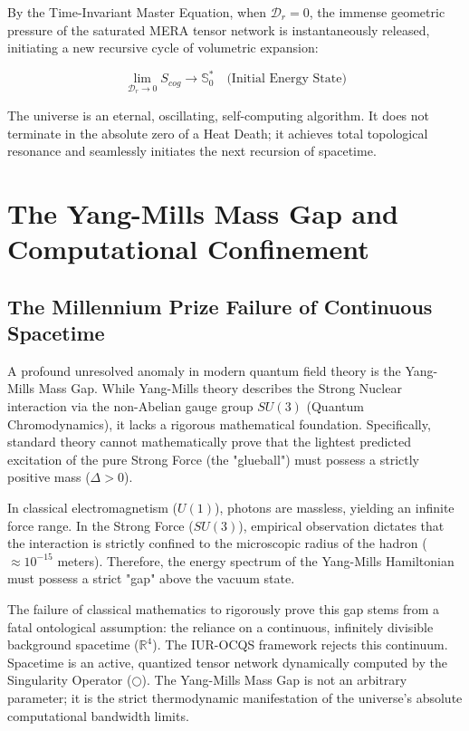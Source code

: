 \documentclass[12pt,openany]{book}
\begin{document}
By the Time-Invariant Master Equation, when $\mathcal{D}_r = 0$, the immense geometric pressure of the saturated MERA tensor network is instantaneously released, initiating a new recursive cycle of volumetric expansion:

\begin{equation}
\lim_{\mathcal{D}_r \to 0} S_{cog} \to \mathbb{S}_0^* \quad \text{(Initial Energy State)}
\end{equation}

The universe is an eternal, oscillating, self-computing algorithm. It does not terminate in the absolute zero of a Heat Death; it achieves total topological resonance and seamlessly initiates the next recursion of spacetime.

\chapter{The Yang-Mills Mass Gap and Computational Confinement}

\section{The Millennium Prize Failure of Continuous Spacetime}
A profound unresolved anomaly in modern quantum field theory is the Yang-Mills Mass Gap. While Yang-Mills theory describes the Strong Nuclear interaction via the non-Abelian gauge group $SU(3)$ (Quantum Chromodynamics), it lacks a rigorous mathematical foundation. Specifically, standard theory cannot mathematically prove that the lightest predicted excitation of the pure Strong Force (the "glueball") must possess a strictly positive mass ($\Delta > 0$).

In classical electromagnetism ($U(1)$), photons are massless, yielding an infinite force range. In the Strong Force ($SU(3)$), empirical observation dictates that the interaction is strictly confined to the microscopic radius of the hadron ($\approx 10^{-15}$ meters). Therefore, the energy spectrum of the Yang-Mills Hamiltonian must possess a strict "gap" above the vacuum state.

The failure of classical mathematics to rigorously prove this gap stems from a fatal ontological assumption: the reliance on a continuous, infinitely divisible background spacetime ($\mathbb{R}^4$). The IUR-OCQS framework rejects this continuum. Spacetime is an active, quantized tensor network dynamically computed by the Singularity Operator ($\bigcirc$). The Yang-Mills Mass Gap is not an arbitrary parameter; it is the strict thermodynamic manifestation of the universe's absolute computational bandwidth limits.
\end{document}
